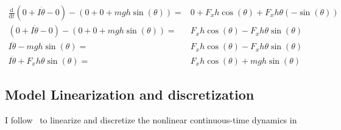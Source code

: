 \documentclass[12pt]{article}
\begin{document}
\begin{align}
\frac{\mathrm{d}}{\mathrm{d}t}
(0+I\dot{\theta}-0)
-(0+0+mgh\sin(\theta))=&0+F_x h\cos(\theta)+F_x h\theta(-\sin(\theta))\\
(0+I\ddot{\theta}-0)
-(0+0+mgh\sin(\theta))=& F_x h\cos(\theta)-F_x h\theta\sin(\theta) \\
I\ddot{\theta}-mgh\sin(\theta)=& F_x h\cos(\theta)-F_x h\theta\sin(\theta) \\
I\ddot{\theta}+F_x h\theta\sin(\theta)=& F_x h\cos(\theta)+mgh\sin(\theta)
\end{align}


\subsection{Model Linearization and discretization}
I follow~\cite{zhakatayev_2017_successive_linearize_MPC}
to linearize and discretize the nonlinear continuous-time dynamics
in~\cite{???}


{}
\end{document}
